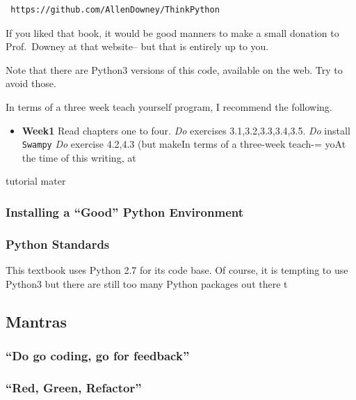 \begin{lstlisting}
 https://github.com/AllenDowney/ThinkPython
\end{lstlisting}

If you liked that book, it would be good manners to make a small
donation to Prof.~Downey at that website-- but that is entirely up to
you.

Note that there are Python3 versions of this code, available on the web.
Try to avoid those.

In terms of a three week teach yourself program, I recommend the
following.

\begin{itemize}
\itemsep1pt\parskip0pt
\item
  \textbf{Week1} Read chapters one to four. \emph{Do} exercises
  3.1,3.2,3.3,3.4,3.5. \emph{Do} install \texttt{Swampy} \emph{Do}
  exercise 4.2,4.3 (but makeIn terms of a three-week teach-= yoAt the
  time of this writing, at
\end{itemize}

tutorial mater

\subsubsection{Installing a ``Good'' Python
Environment}\label{installing-a-good-python-environment}

\subsubsection{Python Standards}\label{python-standards}

This textbook uses Python 2.7 for its code base. Of course, it is
tempting to use Python3 but there are still too many Python packages out
there t

\subsection{Mantras}\label{mantras}

\subsubsection{\texorpdfstring{``Do go coding, go for
feedback''}{Do go coding, go for feedback}}\label{do-go-coding-go-for-feedback}

\subsubsection{\texorpdfstring{``Red, Green,
Refactor''}{Red, Green, Refactor}}\label{red-green-refactor}

